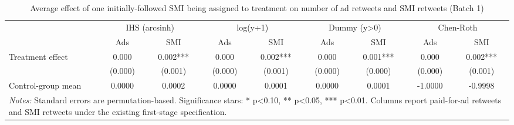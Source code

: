 \begin{table}[!htbp]
\centering
\caption{Average effect of one initially-followed SMI being assigned to treatment on number of ad retweets and SMI retweets (Batch 1)}
\begin{tabular}{lcccccccc}
\hline
 & \multicolumn{2}{c}{IHS (arcsinh)} & \multicolumn{2}{c}{log(y+1)} & \multicolumn{2}{c}{Dummy (y>0)} & \multicolumn{2}{c}{Chen-Roth} \\
 & Ads & SMI & Ads & SMI & Ads & SMI & Ads & SMI \\
\hline
Treatment effect & 0.000 & 0.002*** & 0.000 & 0.002*** & 0.000 & 0.001*** & 0.000 & 0.002*** \\
 & (0.000) & (0.001) & (0.000) & (0.001) & (0.000) & (0.000) & (0.000) & (0.001) \\
Control-group mean & 0.0000 & 0.0002 & 0.0000 & 0.0001 & 0.0000 & 0.0001 & -1.0000 & -0.9998 \\
\hline
\multicolumn{9}{l}{\parbox[t]{15.5cm}{\textit{Notes:} Standard errors are permutation-based. Significance stars: * p<0.10, ** p<0.05, *** p<0.01. Columns report paid-for-ad retweets and SMI retweets under the existing first-stage specification.}} \\
\end{tabular}
\end{table}
